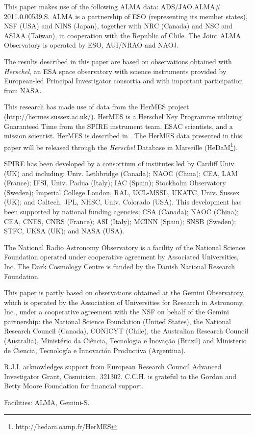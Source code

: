 \documentclass[iop]{emulateapj}
\begin{document}
\begin{acknowledgments}

This paper makes use of the following ALMA data: ADS/JAO.ALMA\# 2011.0.00539.S.
ALMA is a partnership of ESO (representing its member states), NSF (USA) and
NINS (Japan), together with NRC (Canada) and NSC and ASIAA (Taiwan), in
cooperation with the Republic of Chile. The Joint ALMA Observatory is operated
by ESO, AUI/NRAO and NAOJ.

The results described in this paper are based on observations obtained with
{\it Herschel}, an ESA space observatory with science instruments provided by
European-led Principal Investigator consortia and with important participation
from NASA.  

This research has made use of data from the HerMES project
(http://hermes.sussex.ac.uk/). HerMES is a Herschel Key Programme utilizing
Guaranteed Time from the SPIRE instrument team, ESAC scientists, and a mission
scientist. HerMES is described in \citet{Oliver:2012lr}.  The HerMES data
presented in this paper will be released through the {\em Herschel} Database in
Marseille (HeDaM\footnote{http://hedam.oamp.fr/HerMES}).

SPIRE has been developed by a consortium of institutes led by Cardiff Univ.
(UK) and including: Univ. Lethbridge (Canada); NAOC (China); CEA, LAM (France);
IFSI, Univ. Padua (Italy); IAC (Spain); Stockholm Observatory (Sweden);
Imperial College London, RAL, UCL-MSSL, UKATC, Univ. Sussex (UK); and Caltech,
JPL, NHSC, Univ. Colorado (USA). This development has been supported by
national funding agencies: CSA (Canada); NAOC (China); CEA, CNES, CNRS
(France); ASI (Italy); MCINN (Spain); SNSB (Sweden); STFC, UKSA (UK); and NASA
(USA).

The National Radio Astronomy Observatory is a facility of the National Science
Foundation operated under cooperative agreement by Associated Universities,
Inc.  The Dark Cosmology Centre is funded by the Danish National Research
Foundation.

This paper is partly based on observations obtained at the Gemini Observatory,
which is operated by the Association of Universities for Research in Astronomy,
Inc., under a cooperative agreement with the NSF on behalf of the Gemini
partnership: the National Science Foundation (United States), the National
Research Council (Canada), CONICYT (Chile), the Australian Research Council
(Australia), Minist\'erio da Ci\^encia, Tecnologia e Inova\c{c}\~ao (Brazil)
and Ministerio de Ciencia, Tecnolog\'ia e Innovaci\'on Productiva (Argentina).  

R.J.I. acknowledges support from European Research Council Advanced
Investigator Grant, Cosmicism, 321302. C.C.H. is grateful to the Gordon and
Betty Moore Foundation for financial support.

Facilities: ALMA, Gemini-S.

\end{acknowledgments}
\end{document}
